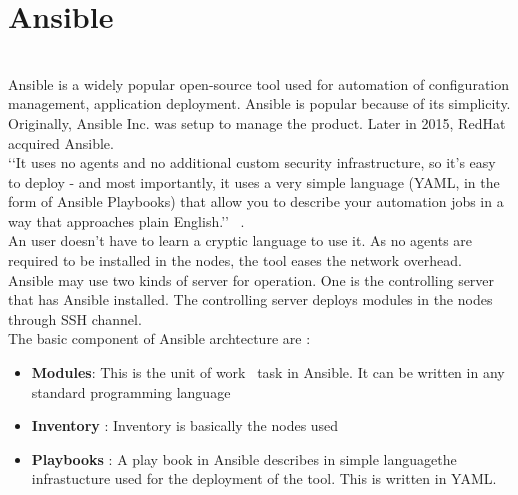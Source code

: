 \section{Ansible}

\\
Ansible is a widely popular open-source tool used for automation of configuration management,
application deployment. Ansible is popular because of its simplicity. Originally, Ansible Inc.
was setup to manage the product. Later in 2015, RedHat acquired Ansible.\\
‘‘It uses no agents and no additional custom security infrastructure, so it’s easy to deploy - 
and most importantly, it uses a very simple language (YAML, in the form of Ansible Playbooks) 
that allow you to describe your automation jobs in a way that approaches plain English.’’
~\cite {hid-sp18-417-doc-Ansible}. \\
An user doesn’t have to learn a cryptic language to use it. 
As no agents are required to be installed in the nodes, the tool eases the network overhead. \\
Ansible may use two kinds of server for operation. One is the controlling server that has Ansible installed.
The controlling server deploys modules in the nodes through SSH channel. \\
The basic component of Ansible archtecture are : \\
\begin{itemize}
\item       \textbf{Modules}: This is the unit of work \ task in Ansible. It can be written in any standard programming language
\item       \textbf{Inventory} : Inventory is basically the nodes used
\item       \textbf{Playbooks} : A play book in Ansible describes in simple languagethe 
infrastucture used for the deployment of the tool. This is written in YAML.
\end{itemize}


